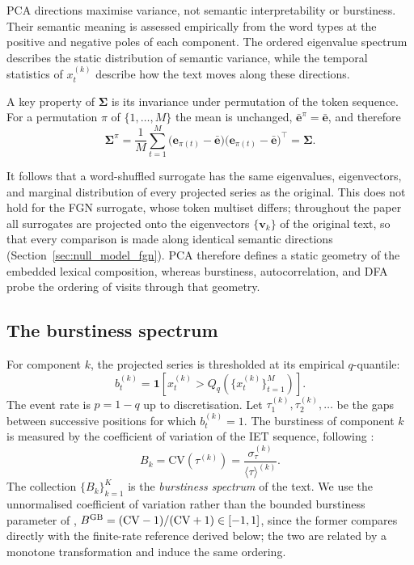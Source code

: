 \documentclass[preprint]{elsarticle}
\newcommand{\bk}{B_k}
\newcommand{\xtk}{x_t^{(k)}}
\newcommand{\vk}{\mathbf{v}_k}
\newcommand{\ebar}{\bar{\mathbf{e}}}
\newcommand{\Sig}{\boldsymbol{\Sigma}}
\newcommand{\meantau}{\langle\tau\rangle}
\newcommand{\sigmatau}{\sigma_\tau}
\newcommand{\CV}{\mathrm{CV}}
\begin{document}
PCA directions maximise variance, not semantic interpretability or
burstiness.
Their semantic meaning is assessed empirically from the word types at
the positive and negative poles of each component.
The ordered eigenvalue spectrum describes the static distribution of
semantic variance, while the temporal statistics of $\xtk$ describe how
the text moves along these directions.

A key property of $\Sig$ is its invariance under permutation of the
token sequence.
For a permutation $\pi$ of $\{1,\ldots,M\}$ the mean is unchanged,
$\ebar^{\pi}=\ebar$, and therefore
\begin{equation}
  \Sig^{\pi}
  =\frac{1}{M}\sum_{t=1}^M
  \bigl(\mathbf{e}_{\pi(t)}-\ebar\bigr)
  \bigl(\mathbf{e}_{\pi(t)}-\ebar\bigr)^\top
  =\Sig.
  \label{eq:sigma_invariant}
\end{equation}

It follows that a word-shuffled surrogate has the same eigenvalues,
eigenvectors, and marginal distribution of every projected series as
the original.
This does not hold for the FGN surrogate, whose token multiset differs;
throughout the paper all surrogates are projected onto the eigenvectors
$\{\vk\}$ of the original text, so that every comparison is made along
identical semantic directions (Section~\ref{sec:null_model_fgn}).
PCA therefore defines a static geometry of the embedded lexical
composition, whereas burstiness, autocorrelation, and DFA probe the
ordering of visits through that geometry.

\subsection{The burstiness spectrum}
\label{sec:burstiness_spectrum}



For component $k$, the projected series is thresholded at its empirical
$q$-quantile:
\begin{equation}
  b_t^{(k)}=
  \mathbf{1}\!\left[
  \xtk>Q_q\!\left(\{\xtk\}_{t=1}^M\right)
  \right].
  \label{eq:binary_k}
\end{equation}
The event rate is $p=1-q$ up to discretisation.
Let $\tau_1^{(k)},\tau_2^{(k)},\ldots$ be the gaps between successive
positions for which $b_t^{(k)}=1$.
The burstiness of component $k$ is measured by the coefficient of
variation of the IET sequence, following \citet{Altmann2012}:
\begin{equation}
  \bk
  =\CV\!\left(\tau^{(k)}\right)
  =\frac{\sigmatau^{(k)}}{\meantau^{(k)}}.
  \label{eq:burstiness_def}
\end{equation}
The collection $\{\bk\}_{k=1}^K$ is the \emph{burstiness spectrum} of
the text.
We use the unnormalised coefficient of variation rather than the
bounded burstiness parameter of \citet{GohBarabasi2008},
$B^{\rm GB}=(\CV-1)/(\CV+1)\in[-1,1]$, since the former compares
directly with the finite-rate reference derived below; the two are
related by a monotone transformation and induce the same ordering.
\end{document}
